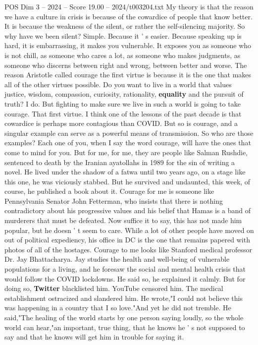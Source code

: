 \begin{textsample}{POS Dim 3 – 2024 – Score 19.00 – 2024/t003204.txt}
My theory is that the reason we have a culture in crisis is because of the cowardice of people that know better.
It is because the weakness of the silent, or rather the self-silencing majority.
So why have we been silent?
Simple.
Because it ' s easier.
Because speaking up is hard, it is embarrassing, it makes you vulnerable.
It exposes you as someone who is not chill, as someone who cares a lot, as someone who makes judgments, as someone who discerns between right and wrong, between better and worse.
The reason Aristotle called courage the first virtue is because it is the one that makes all of the other virtues possible.
Do you want to live in a world that values justice, wisdom, compassion, curiosity, rationality, \textbf{equality} and the pursuit of truth?
I do.
But fighting to make sure we live in such a world is going to take courage.
That first virtue.
I think one of the lessons of the past decade is that cowardice is perhaps more contagious than COVID.
But so is courage, and a singular example can serve as a powerful means of transmission.
So who are those examples?
Each one of you, when I say the word courage, will have the ones that come to mind for you.
But for me, for me, they are people like Salman Rushdie, sentenced to death by the Iranian ayatollahs in 1989 for the sin of writing a novel.
He lived under the shadow of a fatwa until two years ago, on a stage like this one, he was viciously stabbed.
But he survived and undaunted, this week, of course, he published a book about it.
Courage for me is someone like Pennsylvania Senator John Fetterman, who insists that there is nothing contradictory about his progressive values and his belief that Hamas is a band of murderers that must be defeated.
Now suffice it to say, this has not made him popular, but he doesn ' t seem to care.
While a lot of other people have moved on out of political expediency, his office in DC is the one that remains papered with photos of all of the hostages.
Courage to me looks like Stanford medical professor Dr.
Jay Bhattacharya.
Jay studies the health and well-being of vulnerable populations for a living, and he foresaw the social and mental health crisis that would follow the COVID lockdowns.
He said so, he explained it calmly.
But for doing so, \textbf{Twitter} blacklisted him.
YouTube censored him.
The medical establishment ostracized and slandered him.
He wrote,"I could not believe this was happening in a country that I so love."And yet he did not tremble.
He said,"The healing of the world starts by one person saying loudly, so the whole world can hear,"an important, true thing, that he knows he ' s not supposed to say and that he knows will get him in trouble for saying it.

\end{textsample}

